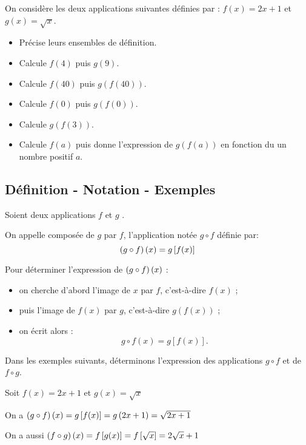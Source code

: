 


  
   \begin{lemma}
    On considère les deux applications suivantes définies par : $ f(x)=2x+1 $  et  $ g(x)=\sqrt{x} $.
  \begin{itemize}
\item  Précise leurs ensembles de définition.
 \item Calcule $ f(4) $  puis $ g(9) $.
 \item Calcule $ f(40) $  puis $ g(f(40)) $.
 \item Calcule $ f(0) $  puis $ g(f(0)) $.
 \item Calcule  $ g(f(3)) $.
 \item Calcule $ f(a) $  puis donne l'expression de $ g(f(a)) $  en fonction du  un nombre positif $ a $.
 \end{itemize}
 \end{lemma}
\subsection*{Définition - Notation - Exemples}

  \begin{definition}
  Soient  deux applications  $f $ et $g$ .
 
 On appelle composée de $ g $  par $ f $, l'application notée $ g\circ f $ définie par:
  \[\left(g\circ f\right)(x)=g\left[ f(x) \right]\]
 \end{definition}
 
 \begin{methode}
 Pour déterminer l’expression de $\left(g \circ f\right)(x)$ :

\begin{itemize}
  \item on cherche d’abord l’image de $x$ par $f$, c’est-à-dire $f(x)$ ;
  \item puis l’image de $f(x)$ par $g$, c’est-à-dire $g(f(x))$ ;
  \item on écrit alors : \[ g \circ f(x) = g[f(x)]. \]
\end{itemize}

 \end{methode}
 Dans les exemples suivants, déterminons l'expression des applications  $ g\circ f $ et de $ f\circ g $.
  \begin{example}
  Soit $ f(x)= 2x+1 $  et $ g(x)=\sqrt{x} $

 
 On a $ \left(g\circ f\right)(x)=g\left[ f(x) \right]= g\left(2x+1\right)=\sqrt{2x+1} $
 


  On a aussi $ \left(f\circ g\right)(x)=f\left[ g(x) \right]= f\left[ \sqrt{x} \right]=2\sqrt{x}+1 $
  \end{example}

